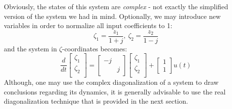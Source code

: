 \documentclass[a4paper,10pt,oneside]{book}
\begin{document}
Obviously, the states of this system are \emph{complex} - not exactly the simplified version of the system we had in mind. Optionally, we may introduce new variables in order to normalize all input coefficients to 1:
\begin{equation}
 \zeta_1=\frac{z_1}{1+j},\ \zeta_2=\frac{z_2}{1-j}
\end{equation}
and the system in $\zeta$-coordinates becomes:
\begin{equation}
 \frac{d}{dt}\left[ {\begin{array}{c} \zeta_1 \\ \zeta_2 \\  \end{array} } \right] = 
\left[ {\begin{array}{cc}
 -j & \\ & j
 \end{array} } \right]\left[ {\begin{array}{c} \zeta_1 \\ \zeta_2 \\  \end{array} } \right] +
\left[ {\begin{array}{c} 1 \\ 1  \end{array} } \right] u(t)
\end{equation} 
Although, one may use the complex diagonalization of a system to draw conclusions regarding its dynamics, it is generally advisable to use the real diagonalization technique that is provided in the next section. 
\end{document}
